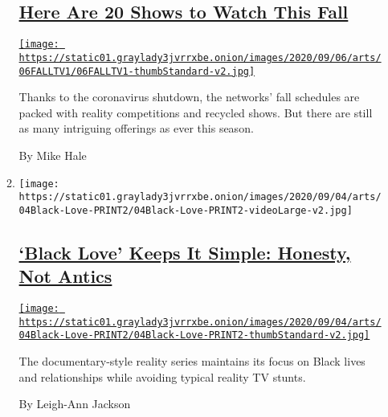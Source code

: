 \begin{enumerate}
\begin{enumerate}
    \hypertarget{here-are-20-shows-to-watch-this-fall}{%
    \subsection{\texorpdfstring{\href{/2020/09/04/arts/television/what-to-watch-tv-shows.html}{Here
    Are 20 Shows to Watch This
    Fall}}{Here Are 20 Shows to Watch This Fall}}\label{here-are-20-shows-to-watch-this-fall}}

    \href{/2020/09/04/arts/television/what-to-watch-tv-shows.html}{\texttt{[image: https://static01.graylady3jvrrxbe.onion/images/2020/09/06/arts/06FALLTV1/06FALLTV1-thumbStandard-v2.jpg]}}

    Thanks to the coronavirus shutdown, the networks' fall schedules are
    packed with reality competitions and recycled shows. But there are
    still as many intriguing offerings as ever this season.

    By Mike Hale
  \item
    \texttt{[image: https://static01.graylady3jvrrxbe.onion/images/2020/09/04/arts/04Black-Love-PRINT2/04Black-Love-PRINT2-videoLarge-v2.jpg]}

    \hypertarget{black-love-keeps-it-simple-honesty-not-antics}{%
    \subsection{\texorpdfstring{\href{/2020/09/03/arts/television/black-love-season-4-own.html}{`Black
    Love' Keeps It Simple: Honesty, Not
    Antics}}{`Black Love' Keeps It Simple: Honesty, Not Antics}}\label{black-love-keeps-it-simple-honesty-not-antics}}

    \href{/2020/09/03/arts/television/black-love-season-4-own.html}{\texttt{[image: https://static01.graylady3jvrrxbe.onion/images/2020/09/04/arts/04Black-Love-PRINT2/04Black-Love-PRINT2-thumbStandard-v2.jpg]}}

    The documentary-style reality series maintains its focus on Black
    lives and relationships while avoiding typical reality TV stunts.

    By Leigh-Ann Jackson
  \end{enumerate}
\end{enumerate}

